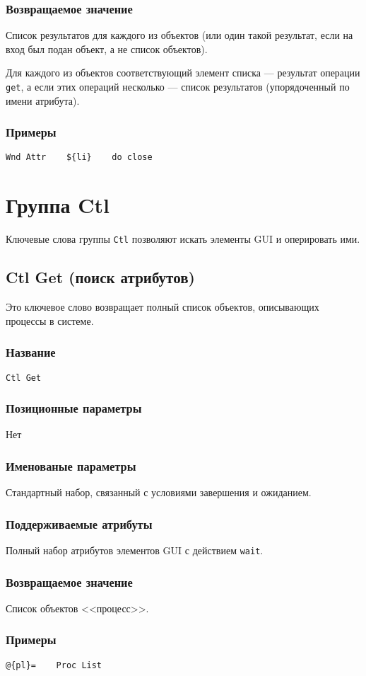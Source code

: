 \documentclass[11pt]{book} %
\begin{document}
\subsubsection*{Возвращаемое значение} 
Список результатов для каждого из объектов (или один такой результат, если на вход был подан объект, а не список объектов).

Для каждого из объектов соответствующий элемент списка --- результат операции \verb|get|, а если этих операций несколько --- список результатов (упорядоченный по имени атрибута).

\subsubsection*{Примеры}
\begin{verbatim}Wnd Attr    ${li}    do close\end{verbatim}





\section{Группа Ctl}
Ключевые слова группы \verb"Ctl" позволяют искать элементы GUI и оперировать ими.

\subsection{Ctl Get (поиск атрибутов)}
Это ключевое слово возвращает полный список объектов, описывающих процессы в системе.


\subsubsection*{Название} 
\verb"Ctl Get"

\subsubsection*{Позиционные параметры} 
Нет

\subsubsection*{Именованые параметры}

Стандартный набор, связанный с условиями завершения и ожиданием.

\subsubsection*{Поддерживаемые атрибуты} 

Полный набор атрибутов элементов GUI с действием \verb|wait|.

\subsubsection*{Возвращаемое значение} 
Список объектов <<процесс>>.

\subsubsection*{Примеры}
\begin{verbatim}@{pl}=    Proc List\end{verbatim}
\end{document}
